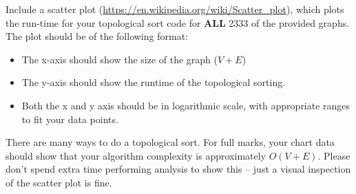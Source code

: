 Include a scatter plot (\url{https://en.wikipedia.org/wiki/Scatter_plot}), which plots the run-time for your topological sort code for {\bf ALL} 2333 of the provided graphs.  The plot should be of the following format:



\begin{itemize}
	\item The x-axis should show the size of the graph ($V + E$)
	\item The y-axis should show the runtime of the topological sorting.
	\item Both the x and y axis should be in logarithmic scale, with appropriate ranges to fit your data points.
\end{itemize}

There are many ways to do a topological sort.  For full marks, your chart data should show that your algorithm complexity is approximately $O(V+E)$.  Please don't spend extra time performing analysis to show this -- just a visual inspection of the scatter plot is fine.


